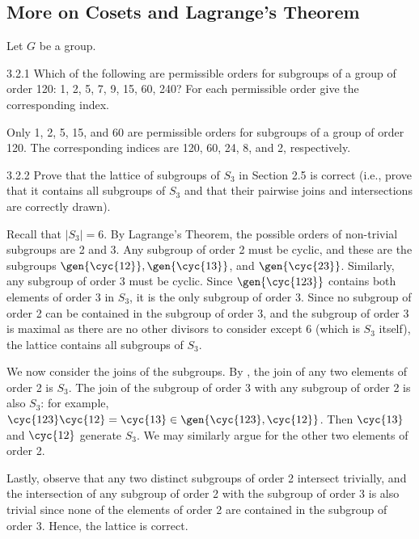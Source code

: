 \subsection{More on Cosets and Lagrange's Theorem}

Let $G$ be a group.

\begin{exercise}{3.2.1}
    Which of the following are permissible orders for subgroups of a group of order 120: 1, 2, 5, 7, 9, 15, 60, 240?
	For each permissible order give the corresponding index.
\end{exercise}

\begin{sol}
    Only 1, 2, 5, 15, and 60 are permissible orders for subgroups of a group of order 120.
	The corresponding indices are 120, 60, 24, 8, and 2, respectively.
\end{sol}

\begin{exercise}{3.2.2}
    Prove that the lattice of subgroups of $S_3$ in Section 2.5 is correct (i.e., prove that it contains all subgroups of $S_3$ and that their pairwise joins and intersections are correctly drawn).
\end{exercise}
\begin{sol}
    Recall that $|S_3| = 6$.
	By Lagrange's Theorem, the possible orders of non-trivial subgroups are 2 and 3.
	Any subgroup of order 2 must be cyclic, and these are the subgroups $\gen{\cyc{1 2}}, \gen{\cyc{1 3}}$, and $\gen{\cyc{2 3}}$.
	Similarly, any subgroup of order 3 must be cyclic.
	Since $\gen{\cyc{1 2 3}}$ contains both elements of order 3 in $S_3$, it is the only subgroup of order 3.
	Since no subgroup of order 2 can be contained in the subgroup of order 3, and the subgroup of order 3 is maximal as there are no other divisors to consider except 6 (which is $S_3$ itself), the lattice contains all subgroups of $S_3$.

    We now consider the joins of the subgroups.
	By , the join of any two elements of order 2 is $S_3$.
	The join of the subgroup of order 3 with any subgroup of order 2 is also $S_3$: for example, $\cyc{1 2 3}\cyc{1 2} = \cyc{1 3} \in \gen{\cyc{1 2 3}, \cyc{1 2}}$.
	Then $\cyc{1 3}$ and $\cyc{1 2}$ generate $S_3$.
	We may similarly argue for the other two elements of order 2.

    Lastly, observe that any two distinct subgroups of order 2 intersect trivially, and the intersection of any subgroup of order 2 with the subgroup of order 3 is also trivial since none of the elements of order 2 are contained in the subgroup of order 3.
	Hence, the lattice is correct.
\end{sol}

